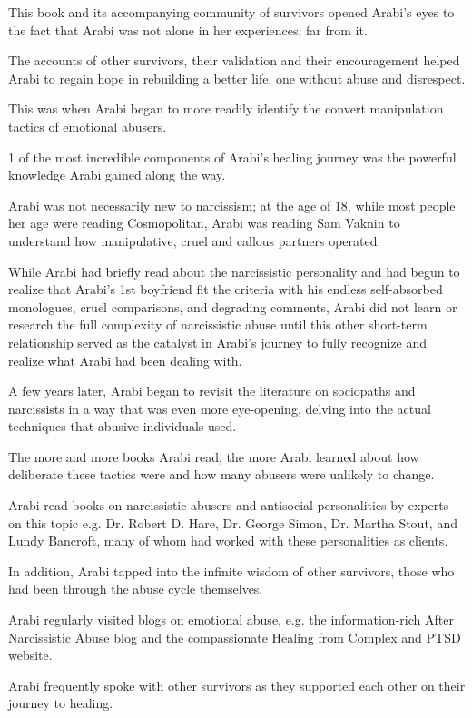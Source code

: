 \documentclass[oneside]{book}
\numberwithin{equation}{section}
\begin{document}
This book and its accompanying community of survivors opened Arabi's eyes to the fact that Arabi was not alone in her experiences; far from it.

The accounts of other survivors, their validation and their encouragement helped Arabi to regain hope in rebuilding a better life, one without abuse and disrespect.

%
This was when Arabi began to more readily identify the convert manipulation tactics of emotional abusers.

1 of the most incredible components of Arabi's healing journey was the powerful knowledge Arabi gained along the way.

Arabi was not necessarily new to narcissism; at the age of 18, while most people her age were reading Cosmopolitan, Arabi was reading Sam Vaknin to understand how manipulative, cruel and callous partners operated.

While Arabi had briefly read about the narcissistic personality and had begun to realize that Arabi's 1st boyfriend fit the criteria with his endless self-absorbed monologues, cruel comparisons, and degrading comments, Arabi did not learn or research the full complexity of narcissistic abuse until this other short-term relationship served as the catalyst in Arabi's journey to fully recognize and realize what Arabi had been dealing with.

%
A few years later, Arabi began to revisit the literature on sociopaths and narcissists in a way that was even more eye-opening, delving into the actual techniques that abusive individuals used.

The more and more books Arabi read, the more Arabi learned about how deliberate these tactics were and how many abusers were unlikely to change.

Arabi read books on narcissistic abusers and antisocial personalities by experts on this topic e.g. Dr. Robert D. Hare, Dr. George Simon, Dr. Martha Stout, and Lundy Bancroft, many of whom had worked with these personalities as clients.

%
In addition, Arabi tapped into the infinite wisdom of other survivors, those who had been through the abuse cycle themselves.

Arabi regularly visited blogs on emotional abuse, e.g. the information-rich After Narcissistic Abuse blog and the compassionate Healing from Complex and PTSD website.

Arabi frequently spoke with other survivors as they supported each other on their journey to healing.
\end{document}
